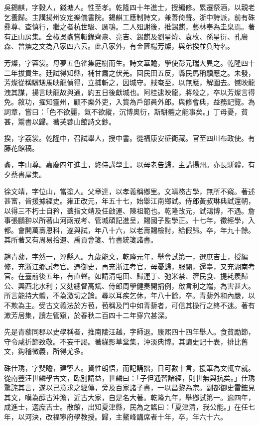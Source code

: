 \begin{pinyinscope}
吳錫麒，字穀人，錢塘人。性至孝。乾隆四十年進士，授編修。累遷祭酒，以親老乞養歸。主講揚州安定樂儀書院。錫麒工應制詩文，兼善倚聲。浙中詩派，前有硃彞尊、查慎行，繼之者杭世駿、厲鶚。二人殂謝後，推錫麒，藝林奉為圭臬焉。著有正山房集。全椒吳鼒嘗輯錄齊燾、亮吉、錫麒及劉星煒、袁枚、孫星衍、孔廣森、曾燠之文為八家四六云。此八家外，有金匱楊芳燦，與弟揆並負時名。

芳燦，字蓉裳。母夢五色雀集庭樹而生。詩文華贍，學使彭元瑞大異之。乾隆四十二年拔貢生。廷試得知縣，補甘肅之伏羌。回民田五反，縣民馬稱驥應之。未發，芳燦從稱驥甥馬映龍偵得，立捕斬之，因城守。賊奄至，以無應，解圍去。憾映龍洩其謀，揚言映龍故與通，約五日後獻城也。阿桂逮映龍，將殺之，卒以芳燦言得免。敘功，擢知靈州，顧不樂外吏，入貲為戶部員外郎。與修會典，益務記覽。為詞章，嘗曰：「色不欲麗，氣不欲縱，沉博奧衍，斯駢體之能事矣。」丁母憂，貧甚，鬻書以歸。著芙蓉山館詩文鈔。

揆，字荔裳。乾隆中，召試舉人，授中書。從福康安征衛藏。官至四川布政使。有藤花館稿。

鼒，字山尊。嘉慶四年進士，終侍講學士。以母老告歸，主講揚州。亦長駢體，有夕蔡書屋集。

徐文靖，字位山，當塗人。父章達，以孝義稱鄉里。文靖務古學，無所不窺。著述甚富，皆援據經史。雍正改元，年五十七，始舉江南鄉試。侍郎黃叔琳典試還朝，以得三不朽士自矜，蓋指文靖及任啟運、陳祖範也。乾隆改元，試鴻博，不遇。詹事張鵬翀以所著山河兩戒考、管城碩記進呈，賜國子監學正。十七年，徵經學，入都。會開萬壽恩科，遂與試，年八十六，以老壽賜檢討，給假歸。卒，年九十餘。其所著又有周易拾遺、禹貢會箋、竹書統箋諸書。

趙青藜，字然一，涇縣人。九歲能文，乾隆元年，舉會試第一，選庶吉士，授編修，充浙江鄉試考官。遷御史，再充浙江考官，母憂歸，服闋，還臺，又充湖南考官。在臺前後五年，有直聲。如請清屯田、歸運丁、弛米禁、濟民食、提耗羨歸公、興西北水利；又劾總督高斌、侍郎周學健奏開捐例，啟言利之端，為害甚大。所言能持大體，不為激切之論。尋以耳疾乞休，年八十餘，卒。青藜外和內嚴，以不欺為主。受古文義法於方苞，苞稱及門中如青藜者，可信其操行之終不迷。著有漱芳居集，讀左管窺，於春秋二百四十二年穿穴甚深。

先是青藜同郡以史學稱者，推南陵汪越，字師退。康熙四十四年舉人。食貧勵節，守令咸折節致敬。不妄干謁。著綠影草堂集，沖淡典博。其讀史記十表，排比舊文，鉤稽微義，所得尤多。

硃仕琇，字斐瞻，建寧人。資性朗悟，而記誦拙，日可數十言，援筆為文輒立就。從南豐汪世麟學古文，臨別請益，世麟曰：「子但通習諸經，則世無與抗矣。」仕琇驚詫其言，遂以己意求之經傳，旁及百家諸子書，一以昌黎為宗。副都御史雷鋐見其文，嘆為醇古沖澹，近古大家，自是名大著。乾隆九年，舉鄉試第一。逾四年，成進士，選庶吉士。散館，出知夏津縣，民為之謠曰：「夏津清，我公能。」在任七年，以河決，改福寧府學教授。歸，主鰲峰講席者十年，卒，年六十六。


\end{pinyinscope}
